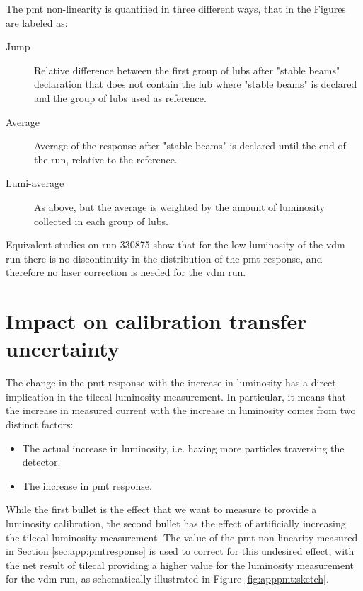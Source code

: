 The \gls{pmt} non-linearity is quantified in three different ways, that in the Figures are labeled as:
\begin{description}
\item[Jump] Relative difference between the first group of \glspl{lub} after "stable beams" declaration that does not contain the 
\gls{lub} where "stable beams" is declared and the group of \glspl{lub} used as reference.
\item[Average] Average of the response after "stable beams" is declared until the end of the run, relative to the reference.
\item[Lumi-average] As above, but the average is weighted by the amount of luminosity collected in each group of \glspl{lub}.
\end{description}

 Equivalent studies on run 330875 show that for the low luminosity of the \gls{vdm} run there is no discontinuity in the 
 distribution of the \gls{pmt} response, and therefore no laser correction is needed for the \gls{vdm} run. 

\FloatBarrier


\section{Impact on calibration transfer uncertainty}

The change in the \gls{pmt} response with the increase in luminosity has a direct implication in the 
\gls{tilecal} luminosity measurement. 
In particular, it means that the increase in measured current with the increase in luminosity comes from 
two distinct factors:
\begin{itemize}
\item The actual increase in luminosity, i.e. having more particles traversing the detector.
\item The increase in \gls{pmt} response.
\end{itemize}

While the first bullet is the effect that we want to measure to provide a luminosity calibration, 
the second bullet has the effect of artificially increasing the \gls{tilecal} 
luminosity measurement. The value of the \gls{pmt} non-linearity measured in Section \ref{sec:app:pmtresponse} 
is used to correct for this undesired effect, with the net result of \gls{tilecal} providing a higher value 
for the luminosity measurement for the \gls{vdm} run, as schematically illustrated in Figure \ref{fig:apppmt:sketch}.


